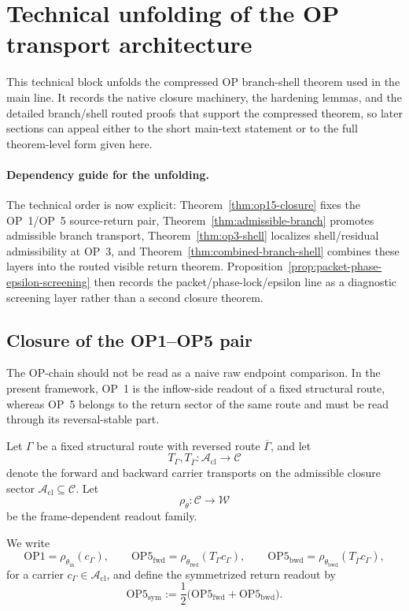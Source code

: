 \section*{Technical unfolding of the OP transport architecture}
This technical block unfolds the compressed OP branch-shell theorem used in the main line. It records the native closure machinery, the hardening lemmas, and the detailed branch/shell routed proofs that support the compressed theorem, so later sections can appeal either to the short main-text statement or to the full theorem-level form given here.

\paragraph{Dependency guide for the unfolding.}\label{par:op-unfolding-dependency-guide}
The technical order is now explicit: Theorem~\ref{thm:op15-closure} fixes the OP~1/OP~5 source-return pair, Theorem~\ref{thm:admissible-branch} promotes admissible branch transport, Theorem~\ref{thm:op3-shell} localizes shell/residual admissibility at OP~3, and Theorem~\ref{thm:combined-branch-shell} combines these layers into the routed visible return theorem. Proposition~\ref{prop:packet-phase-epsilon-screening} then records the packet/phase-lock/epsilon line as a diagnostic screening layer rather than a second closure theorem.

\subsection{Closure of the OP1--OP5 pair}

The OP-chain should not be read as a naive raw endpoint comparison. In the present framework, OP~1 is the inflow-side readout of a fixed structural route, whereas OP~5 belongs to the return sector of the same route and must be read through its reversal-stable part.

Let $\Gamma$ be a fixed structural route with reversed route $\overline{\Gamma}$, and let
\[
T_{\Gamma},T_{\overline{\Gamma}}:\mathcal{A}_{\mathrm{cl}}\to\mathcal{C}
\]
denote the forward and backward carrier transports on the admissible closure sector $\mathcal{A}_{\mathrm{cl}}\subseteq\mathcal{C}$. Let
\[
\rho_{\theta}:\mathcal{C}\to\mathcal{W}
\]
be the frame-dependent readout family.

We write
\[
\mathrm{OP1}=\rho_{\theta_{\mathrm{in}}}(c_{\Gamma}),
\qquad
\mathrm{OP5}_{\mathrm{fwd}}=\rho_{\theta_{\mathrm{fwd}}}(T_{\Gamma}c_{\Gamma}),
\qquad
\mathrm{OP5}_{\mathrm{bwd}}=\rho_{\theta_{\mathrm{bwd}}}(T_{\overline{\Gamma}}c_{\Gamma}),
\]
for a carrier $c_{\Gamma}\in\mathcal{A}_{\mathrm{cl}}$, and define the symmetrized return readout by
\[
\mathrm{OP5}_{\mathrm{sym}}
:=
\frac12\bigl(\mathrm{OP5}_{\mathrm{fwd}}+\mathrm{OP5}_{\mathrm{bwd}}\bigr).
\]

